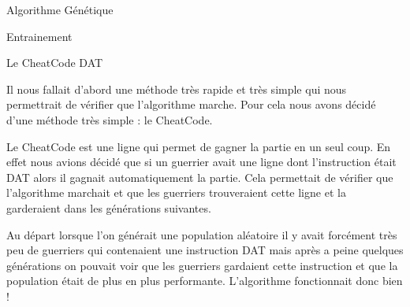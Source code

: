 \documentclass[a4paper, 10pt]{article}
\begin{document}
\begin{section}{Algorithme Génétique}
\begin{subsection}{Entrainement}
                \begin{subsubsection}{Le CheatCode DAT}
                    \par
                        Il nous fallait d'abord une méthode très rapide et très simple qui nous permettrait de vérifier que l'algorithme marche. Pour cela nous avons décidé d'une méthode très simple : le CheatCode.
                        \medskip
                    \par
                        Le CheatCode est une ligne qui permet de gagner la partie en un seul coup. En effet nous avions décidé que si un guerrier avait une ligne dont l'instruction était DAT alors il gagnait automatiquement la partie. Cela permettait de vérifier que l'algorithme marchait et que les guerriers trouveraient cette ligne et la garderaient dans les générations suivantes.
                        \medskip
                    \par
                        Au départ lorsque l'on générait une population aléatoire il y avait forcément très peu de guerriers qui contenaient une instruction DAT mais après a peine quelques générations on pouvait voir que les guerriers gardaient cette instruction et que la population était de plus en plus performante. L'algorithme fonctionnait donc bien !
                        \bigskip
                \end{subsubsection}


\end{subsection}
\end{section}
\end{document}
